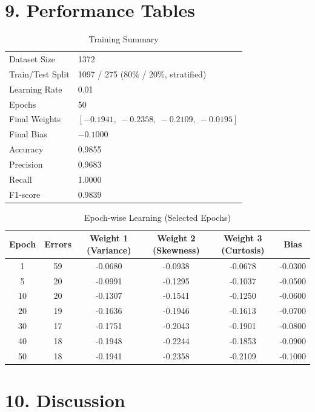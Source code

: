 \documentclass[11pt]{article}
\begin{document}

\section*{9. Performance Tables}

\begin{table}[H]
\centering
\caption{Training Summary}
\begin{tabular}{ll}
\toprule
Dataset Size & 1372 \\
Train/Test Split & 1097 / 275 (80\% / 20\%, stratified) \\
Learning Rate & 0.01 \\
Epochs & 50 \\
Final Weights & $[-0.1941,\ -0.2358,\ -0.2109,\ -0.0195]$ \\
Final Bias & $-0.1000$ \\
Accuracy & 0.9855 \\
Precision & 0.9683 \\
Recall & 1.0000 \\
F1-score & 0.9839 \\
\bottomrule
\end{tabular}
\end{table}

\begin{table}[H]
\centering
\caption{Epoch-wise Learning (Selected Epochs)}
\begin{tabular}{cccccc}
\toprule
Epoch & Errors & Weight 1 (Variance) & Weight 2 (Skewness) & Weight 3 (Curtosis) & Bias\\
\midrule
1  & 59 & -0.0680 & -0.0938 & -0.0678 & -0.0300 \\
5  & 20 & -0.0991 & -0.1295 & -0.1037 & -0.0500 \\
10 & 20 & -0.1307 & -0.1541 & -0.1250 & -0.0600 \\
20 & 19 & -0.1636 & -0.1946 & -0.1613 & -0.0700 \\
30 & 17 & -0.1751 & -0.2043 & -0.1901 & -0.0800 \\
40 & 18 & -0.1948 & -0.2244 & -0.1853 & -0.0900 \\
50 & 18 & -0.1941 & -0.2358 & -0.2109 & -0.1000 \\
\bottomrule
\end{tabular}
\end{table}


\section*{10. Discussion}
\end{document}
